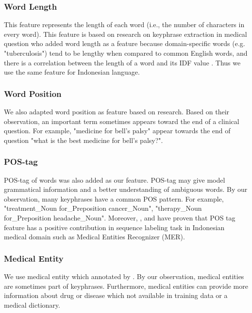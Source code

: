 \subsubsection{Word Length\\}
This feature represents the length of each word (i.e., the number of characters in every word). This feature is based on \cite{cao2010automatically} research on keyphrase extraction in medical question who added word length as a feature because domain-specific words (e.g. "tuberculosis") tend to be lengthy when compared to common English words, and there is a correlation between the length of a word and its IDF value \citep{cao2010automatically}. Thus we use the same feature for Indonesian language.

\subsubsection{Word Position\\}
We also adapted word position as feature based on \cite{cao2010automatically}research. Based on their observation, an important term sometimes appears toward the end of a clinical question. For example, "medicine for bell’s palsy" appear towards the end of question "what is the best medicine for bell’s palsy?". 

\subsubsection{POS-tag\\}
POS-tag of words was also added as our feature. POS-tag may give model grammatical information and a better understanding of ambiguous words. By our observation, many keyphrases have a common POS pattern. For example, "treatment\_Noun for\_Preposition cancer\_Noun", "therapy\_Noun for\_Preposition headache\_Noun". Moreover, \cite{skripsiWahid}, and \cite{abacha2011medical} have proven that POS tag feature has a positive contribution in sequence labeling task in Indonesian medical domain such as Medical Entities Recognizer (MER).

\subsubsection{Medical Entity\\}
We use medical entity which annotated by \cite{skripsiWahid}. By our observation, medical entities are sometimes part of keyphrases. Furthermore, medical entities can provide more information about drug or disease which not available in training data or a medical dictionary.

